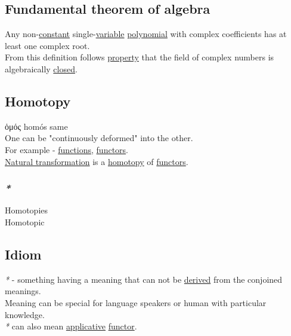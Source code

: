 \documentclass[11pt]{article}
\begin{document}
\subsection{\label{org3d6474b}Fundamental theorem of algebra}
\label{sec:org47b882c}
Any non-\hyperref[org6cc4f99]{constant} single-\hyperref[org301bab5]{variable} \hyperref[org8d600cc]{polynomial} with complex coefficients has at least one complex root.\\

From this definition follows \hyperref[org07ca26b]{property} that the field of complex numbers is algebraically \hyperref[orgfa67abb]{closed}.\\

\subsection{\label{orgc7221e4}Homotopy}
\label{sec:org89692be}
ὁμός homós same\\

One can be "continuously deformed" into the other.\\

For example - \hyperref[org66c5288]{functions}, \hyperref[org6c3c2a6]{functors}.\\
\hyperref[org381dd2b]{Natural transformation} is a \hyperref[orgc7221e4]{homotopy} of \hyperref[org6c3c2a6]{functors}.\\

\subsubsection{\emph{*}}
\label{sec:org6ec1a63}

\label{org47b0f9c}Homotopies\\
\label{orgcacbf17}Homotopic\\

\subsection{\label{orgbda6e51}Idiom}
\label{sec:org5d6fcc3}
\emph{*} - something having a meaning that can not be \hyperref[org0c133f8]{derived} from the conjoined meanings.\\
Meaning can be special for language speakers or human with particular knowledge.\\

\emph{*} can also mean \hyperref[org24a6930]{applicative} \hyperref[org6073683]{functor}.\\
\end{document}
